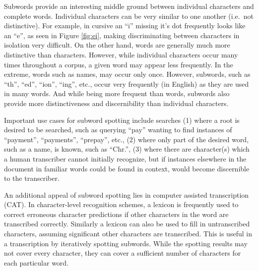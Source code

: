 \documentclass[ms,electronic,twosidetoc,letterpaper,chaptercenter,parttop,lof,lot]{byumsphd}
\begin{document}
Subwords provide an interesting middle ground between individual characters and complete words. %
Individual characters can be very similar to one another (i.e.~not distinctive). For example, in cursive an ``i'' missing it's dot frequently looks like an ``e'', as seen in Figure \ref{fig:ei}, making discriminating between characters in isolation very difficult. On the other hand, words are generally much more distinctive than characters. However, while individual characters occur many times throughout a corpus, a given word may appear less frequently. In the extreme, words such as names, may occur only once. However, subwords, such as ``th'', ``ed'', ``ion'', ``ing'', etc., occur very frequently (in English) as they are used in many words. And while being more frequent than words, subwords also provide more distinctiveness and discernibility than individual characters.



Important use cases for subword spotting include searches (1) where a root is desired to be searched, such as querying ``pay'' wanting to find instances of ``payment'', ``payments'', ``prepay'', etc., (2) where only part of the desired word, such as a name, is known, such as ``Chr.'', (3) where there are character(s) which a human transcriber cannot initially recognize, but if instances elsewhere in the document in familiar words could be found in context, would become discernible to the transcriber.

An additional appeal of subword spotting lies in computer assisted transcription (CAT). In character-level recognition schemes, a lexicon is frequently used to correct erroneous character predictions if other characters in the word are transcribed correctly. Similarly a lexicon can also be used to fill in untranscribed characters, assuming significant other characters are transcribed. This is useful in a transcription by iteratively spotting subwords. While the spotting results may not cover every character, they can cover a sufficient number of characters for each particular word.
\end{document}
